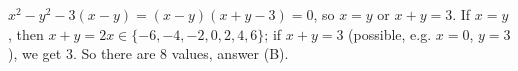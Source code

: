 $x^2-y^2-3(x-y)=(x-y)(x+y-3)=0$, so $x=y$ or $x+y=3$. If $x=y$, then $x+y=2x\in\{-6,-4,-2,0,2,4,6\}$; if $x+y=3$ (possible, e.g. $x=0$, $y=3$), we get $3$. So there are $\boxed{8}$ values, answer (B).

